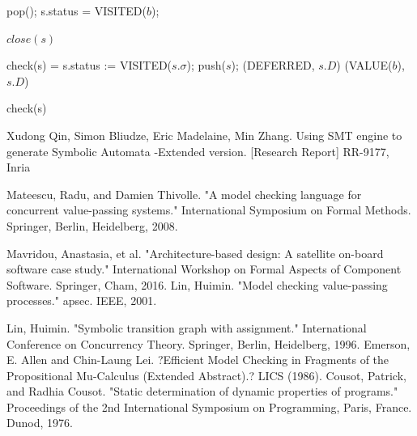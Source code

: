 \documentclass[runningheads,a4paper]{llncs}
\begin{document}
\begin{algorithm}
\begin{algorithmic}[1]
		\State pop(); 
		\State s.status = VISITED($b$); 
		\EndIf
		\EndIf
	\end{algorithmic} 
	\caption{$close(s)$}
	\label{alg:algorithm2}
\end{algorithm}	


\begin{algorithm} 
	\begin{algorithmic}[1]
		\State check(s) =
		\State s.status := VISITED($s.\sigma$); push($s$); \Return (DEFERRED, $s.D$)
		\EndCase
		\Return (VALUE($b$), $s.D$)
		\EndCase
		\EndSwitch
		
	\end{algorithmic} 
	\caption{check(s)}
	\label{alg:algorithm3}
\end{algorithm}





\begin{thebibliography}{4}
	Xudong Qin, Simon Bliudze, Eric Madelaine, Min Zhang. Using SMT engine to generate Symbolic Automata -Extended version. [Research Report] RR-9177, Inria
	
	Mateescu, Radu, and Damien Thivolle. "A model checking language for concurrent value-passing systems." International Symposium on Formal Methods. Springer, Berlin, Heidelberg, 2008.
	
	 Mavridou, Anastasia, et al. "Architecture-based design: A satellite on-board software case study." International Workshop on Formal Aspects of Component Software. Springer, Cham, 2016.
	 Lin, Huimin. "Model checking value-passing processes." apsec. IEEE, 2001.

	 Lin, Huimin. "Symbolic transition graph with assignment." International Conference on Concurrency Theory. Springer, Berlin, Heidelberg, 1996.
	Emerson, E. Allen and Chin-Laung Lei. ?Efficient Model Checking in Fragments of the Propositional Mu-Calculus (Extended Abstract).? LICS (1986).
	Cousot, Patrick, and Radhia Cousot. "Static determination of dynamic properties of programs." Proceedings of the 2nd International Symposium on Programming, Paris, France. Dunod, 1976.
	
\end{thebibliography}
\end{document}
